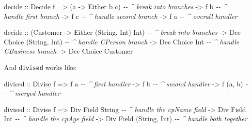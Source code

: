 \documentclass[]{article}
\newenvironment{Shaded}{}{}
\newcommand{\CommentTok}[1]{\textcolor[rgb]{0.38,0.63,0.69}{\textit{#1}}}
\newcommand{\DataTypeTok}[1]{\textcolor[rgb]{0.56,0.13,0.00}{#1}}
\newcommand{\NormalTok}[1]{#1}
\newcommand{\OtherTok}[1]{\textcolor[rgb]{0.00,0.44,0.13}{#1}}
\begin{document}
\begin{Shaded}
\begin{Highlighting}[]
\NormalTok{decide}
\OtherTok{    ::} \DataTypeTok{Decide}\NormalTok{ f}
    \OtherTok{=>}\NormalTok{ (a }\OtherTok{{-}>} \DataTypeTok{Either}\NormalTok{ b c)    }\CommentTok{{-}{-} \^{} break into branches}
    \OtherTok{{-}>}\NormalTok{ f b                  }\CommentTok{{-}{-} \^{} handle first branch}
    \OtherTok{{-}>}\NormalTok{ f c                  }\CommentTok{{-}{-} \^{} handle second branch}
    \OtherTok{{-}>}\NormalTok{ f a                  }\CommentTok{{-}{-} \^{} overall handler}

\NormalTok{decide}
\OtherTok{    ::}\NormalTok{ (}\DataTypeTok{Customer} \OtherTok{{-}>} \DataTypeTok{Either}\NormalTok{ (}\DataTypeTok{String}\NormalTok{, }\DataTypeTok{Int}\NormalTok{) }\DataTypeTok{Int}\NormalTok{)   }\CommentTok{{-}{-} \^{} break into branches}
    \OtherTok{{-}>} \DataTypeTok{Dec} \DataTypeTok{Choice}\NormalTok{ (}\DataTypeTok{String}\NormalTok{, }\DataTypeTok{Int}\NormalTok{)                 }\CommentTok{{-}{-} \^{} handle CPerson branch}
    \OtherTok{{-}>} \DataTypeTok{Dec} \DataTypeTok{Choice} \DataTypeTok{Int}                           \CommentTok{{-}{-} \^{} handle CBusiness branch}
    \OtherTok{{-}>} \DataTypeTok{Dec} \DataTypeTok{Choice} \DataTypeTok{Customer}
\end{Highlighting}
\end{Shaded}

And \texttt{divised} works like:

\begin{Shaded}
\begin{Highlighting}[]
\NormalTok{divised}
\OtherTok{    ::} \DataTypeTok{Divise}\NormalTok{ f}
    \OtherTok{=>}\NormalTok{ f a          }\CommentTok{{-}{-} \^{} first handler}
    \OtherTok{{-}>}\NormalTok{ f b          }\CommentTok{{-}{-} \^{} second handler}
    \OtherTok{{-}>}\NormalTok{ f (a, b)     }\CommentTok{{-}{-} \^{} merged handler}

\NormalTok{divised}
\OtherTok{    ::} \DataTypeTok{Divise}\NormalTok{ f}
    \OtherTok{=>} \DataTypeTok{Div} \DataTypeTok{Field} \DataTypeTok{String}          \CommentTok{{-}{-} \^{} handle the cpName field}
    \OtherTok{{-}>} \DataTypeTok{Div} \DataTypeTok{Field} \DataTypeTok{Int}             \CommentTok{{-}{-} \^{} handle the cpAge field}
    \OtherTok{{-}>} \DataTypeTok{Div} \DataTypeTok{Field}\NormalTok{ (}\DataTypeTok{String}\NormalTok{, }\DataTypeTok{Int}\NormalTok{)   }\CommentTok{{-}{-} \^{} handle both together}
\end{Highlighting}
\end{Shaded}
\end{document}
